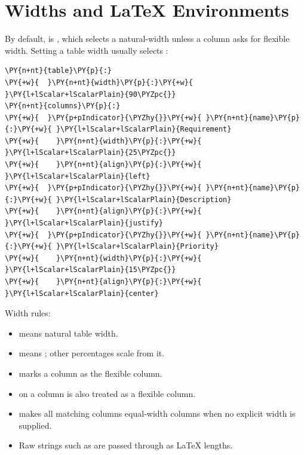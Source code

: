 \documentclass[a4paper,twoside]{article}
\begin{document}
\section{Widths and \LaTeX{} Environments}
By default,  is , which selects a natural-width 
unless a column asks for flexible width. Setting a table width usually selects
:
\begin{tscode}[lang=yaml, engine=pygments]
\begin{Verbatim}[commandchars=\\\{\},breaklines, breakanywhere, commandchars=\\\{\}]
\PY{n+nt}{table}\PY{p}{:}
\PY{+w}{  }\PY{n+nt}{width}\PY{p}{:}\PY{+w}{ }\PY{l+lScalar+lScalarPlain}{90\PYZpc{}}
\PY{n+nt}{columns}\PY{p}{:}
\PY{+w}{  }\PY{p+pIndicator}{\PYZhy{}}\PY{+w}{ }\PY{n+nt}{name}\PY{p}{:}\PY{+w}{ }\PY{l+lScalar+lScalarPlain}{Requirement}
\PY{+w}{    }\PY{n+nt}{width}\PY{p}{:}\PY{+w}{ }\PY{l+lScalar+lScalarPlain}{25\PYZpc{}}
\PY{+w}{    }\PY{n+nt}{align}\PY{p}{:}\PY{+w}{ }\PY{l+lScalar+lScalarPlain}{left}
\PY{+w}{  }\PY{p+pIndicator}{\PYZhy{}}\PY{+w}{ }\PY{n+nt}{name}\PY{p}{:}\PY{+w}{ }\PY{l+lScalar+lScalarPlain}{Description}
\PY{+w}{    }\PY{n+nt}{align}\PY{p}{:}\PY{+w}{ }\PY{l+lScalar+lScalarPlain}{justify}
\PY{+w}{  }\PY{p+pIndicator}{\PYZhy{}}\PY{+w}{ }\PY{n+nt}{name}\PY{p}{:}\PY{+w}{ }\PY{l+lScalar+lScalarPlain}{Priority}
\PY{+w}{    }\PY{n+nt}{width}\PY{p}{:}\PY{+w}{ }\PY{l+lScalar+lScalarPlain}{15\PYZpc{}}
\PY{+w}{    }\PY{n+nt}{align}\PY{p}{:}\PY{+w}{ }\PY{l+lScalar+lScalarPlain}{center}
\end{Verbatim}
\end{tscode}
Width rules:
\begin{itemize}
\item {} means natural table width.
\item {} means ; other percentages scale from it.
\item {} marks a column as the flexible  column.
\item {} on a column is also treated as a flexible  column.
\item {} makes all matching columns equal-width  columns
when no explicit width is supplied.
\item Raw strings such as \tscodeinline{2.5cm} are passed through as \LaTeX{} lengths.
\end{itemize}
\end{document}
